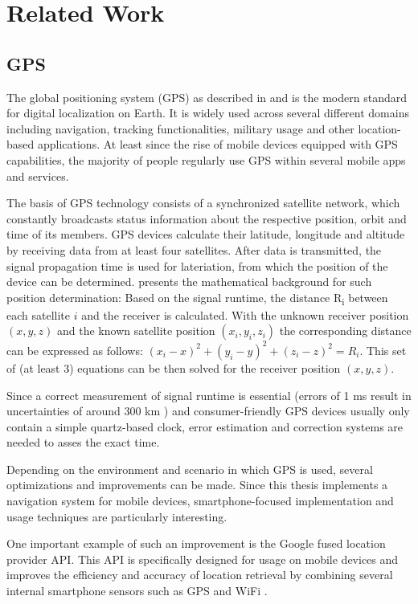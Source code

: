 \chapter{Related Work}
\label{cha:relatedwork}

\section{GPS}
The global positioning system (GPS) as described in \cite{272176} and \cite{1013999415003} is the modern standard for digital localization on Earth. It is widely used across several different domains including navigation, tracking functionalities, military usage and other location-based applications. At least since the rise of mobile devices equipped with GPS capabilities, the majority of people regularly use GPS within several mobile apps and services.

The basis of GPS technology consists of a synchronized satellite network, which constantly broadcasts status information about the respective position, orbit and time of its members. GPS devices calculate their latitude, longitude and altitude by receiving data from at least four satellites. After data is transmitted, the signal propagation time is used for lateriation, from which the position of the device can be determined. \cite{lateriation} presents the mathematical background for such position determination: Based on the signal runtime, the distance R\textsubscript{i} between each satellite $i$ and the receiver is calculated. With the unknown receiver position $(x, y, z)$ and the known satellite position $(x_{i}, y_{i}, z_{i})$ the corresponding distance can be expressed as follows: $(x_{i} - x)^{2} + (y_{i} - y)^{2} + (z_{i} - z)^{2} = R_{i}.$ This set of (at least 3) equations can be then solved for the receiver position $(x, y, z)$.

Since a correct measurement of signal runtime is essential (errors of 1 ms result in uncertainties of around 300 km \cite{1013999415003}) and consumer-friendly GPS devices usually only contain a simple quartz-based clock, error estimation and correction systems are needed to asses the exact time.

Depending on the environment and scenario in which GPS is used, several optimizations and improvements can be made. Since this thesis implements a navigation system for mobile devices, smartphone-focused implementation and usage techniques are particularly interesting.

One important example of such an improvement is the Google fused location provider API. This API is specifically designed for usage on mobile devices and improves the efficiency and accuracy of location retrieval by combining several internal smartphone sensors such as GPS and WiFi \cite{fused_location_api}.

